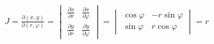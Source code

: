 \documentclass[preview]{standalone}
\begin{document}
\begin{align*}
J = \frac{\partial (x, y)}{\partial (r, \varphi)} =  \begin{vmatrix}\frac{\partial x}{\partial r} & \frac{\partial x}{\partial \varphi} \\\frac{\partial y}{\partial r} & \frac{\partial y}{\partial \varphi}\end{vmatrix} = \begin{vmatrix}\cos \varphi & -r \sin \varphi \\\sin \varphi & r \cos \varphi\end{vmatrix} = r
\end{align*}
\end{document}
